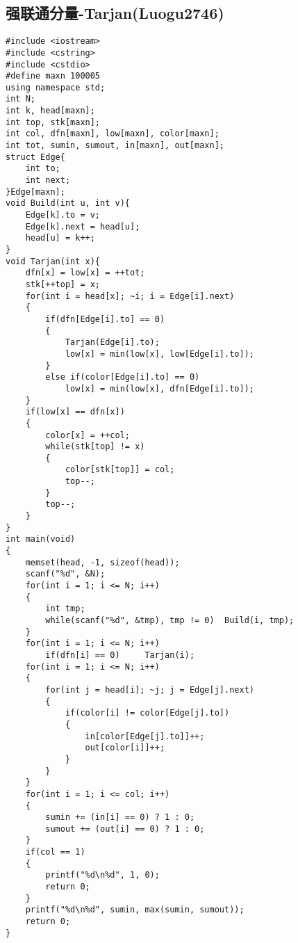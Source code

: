 \documentclass[UTF8]{ctexart}
\begin{document}
	\subsection{强联通分量-Tarjan(Luogu2746)}
	{\setmainfont{Consolas}
\begin{lstlisting}
#include <iostream>
#include <cstring>
#include <cstdio>
#define maxn 100005
using namespace std;
int N;
int k, head[maxn];
int top, stk[maxn];
int col, dfn[maxn], low[maxn], color[maxn];
int tot, sumin, sumout, in[maxn], out[maxn];
struct Edge{
    int to;
    int next;
}Edge[maxn];
void Build(int u, int v){
    Edge[k].to = v;
    Edge[k].next = head[u];
    head[u] = k++;
}
void Tarjan(int x){
    dfn[x] = low[x] = ++tot;
    stk[++top] = x;
    for(int i = head[x]; ~i; i = Edge[i].next)
    {
        if(dfn[Edge[i].to] == 0)
        {
            Tarjan(Edge[i].to);
            low[x] = min(low[x], low[Edge[i].to]);
        }
        else if(color[Edge[i].to] == 0)
            low[x] = min(low[x], dfn[Edge[i].to]);
    }
    if(low[x] == dfn[x])
    {
        color[x] = ++col;
        while(stk[top] != x)
        {
            color[stk[top]] = col;
            top--;
        }
        top--;
    }
}
int main(void)
{
    memset(head, -1, sizeof(head));
    scanf("%d", &N);
    for(int i = 1; i <= N; i++)
    {
        int tmp;
        while(scanf("%d", &tmp), tmp != 0)	Build(i, tmp);
    }
    for(int i = 1; i <= N; i++)
        if(dfn[i] == 0)		Tarjan(i);
    for(int i = 1; i <= N; i++)
    {
		for(int j = head[i]; ~j; j = Edge[j].next)
        {
            if(color[i] != color[Edge[j].to])
            {
                in[color[Edge[j].to]]++;
                out[color[i]]++;
            }
        }
	}
    for(int i = 1; i <= col; i++)
    {
        sumin += (in[i] == 0) ? 1 : 0;
        sumout += (out[i] == 0) ? 1 : 0;
    }
    if(col == 1)
    {
        printf("%d\n%d", 1, 0);
        return 0;
    }
    printf("%d\n%d", sumin, max(sumin, sumout));
    return 0;
}
\end{lstlisting}}
\newpage
\end{document}
